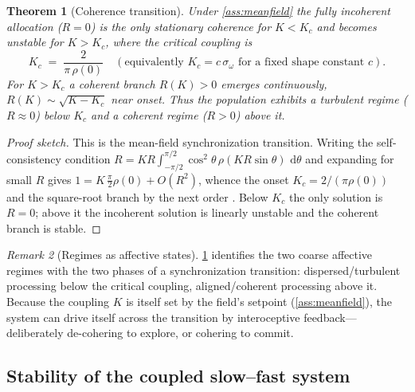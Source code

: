 \documentclass[11pt,a4paper]{article}
\theoremstyle{plain}
\newtheorem{theorem}{Theorem}[section]
\theoremstyle{definition}
\theoremstyle{remark}
\newtheorem{remark}[theorem]{Remark}
\newcommand{\coh}{R}                           %
\newcommand{\dd}{\,\mathrm{d}}
\begin{document}
\begin{theorem}[Coherence transition]
\label{thm:transition}
Under \cref{ass:meanfield} the fully incoherent allocation
($\coh=0$) is the only stationary coherence for $K<K_c$ and becomes unstable for
$K>K_c$, where the critical coupling is
\begin{equation}
K_c\;=\;\frac{2}{\pi\,\rho(0)}\quad(\text{equivalently } K_c=c\,\sigma_\omega
\text{ for a fixed shape constant }c).
\label{eq:Kc}
\end{equation}
For $K>K_c$ a coherent branch $\coh(K)>0$ emerges continuously,
$\coh(K)\sim\sqrt{K-K_c}$ near onset. Thus the population exhibits a
\emph{turbulent} regime ($\coh\approx0$) below $K_c$ and a \emph{coherent}
regime ($\coh>0$) above it.
\end{theorem}
\begin{proof}[Proof sketch]
This is the mean-field synchronization transition. Writing the self-consistency
condition $\coh=K\coh\int_{-\pi/2}^{\pi/2}\cos^2\theta\,\rho(K\coh\sin\theta)\,
\dd\theta$ and expanding for small $\coh$ gives $1=K\,\tfrac{\pi}{2}\rho(0)+
O(\coh^2)$, whence the onset $K_c=2/(\pi\rho(0))$ and the square-root branch by
the next order \citep{strogatz2000,kuramoto1984}. Below $K_c$ the only solution
is $\coh=0$; above it the incoherent solution is linearly unstable and the
coherent branch is stable.
\end{proof}

\begin{remark}[Regimes as affective states]
\cref{thm:transition} identifies the two coarse affective regimes with the two
phases of a synchronization transition: dispersed/turbulent processing below the
critical coupling, aligned/coherent processing above it. Because the coupling
$K$ is itself set by the field's setpoint (\cref{ass:meanfield}), the system can
drive itself across the transition by interoceptive feedback---deliberately
de-cohering to explore, or cohering to commit.
\end{remark}

\subsection{Stability of the coupled slow--fast system}
\end{document}

